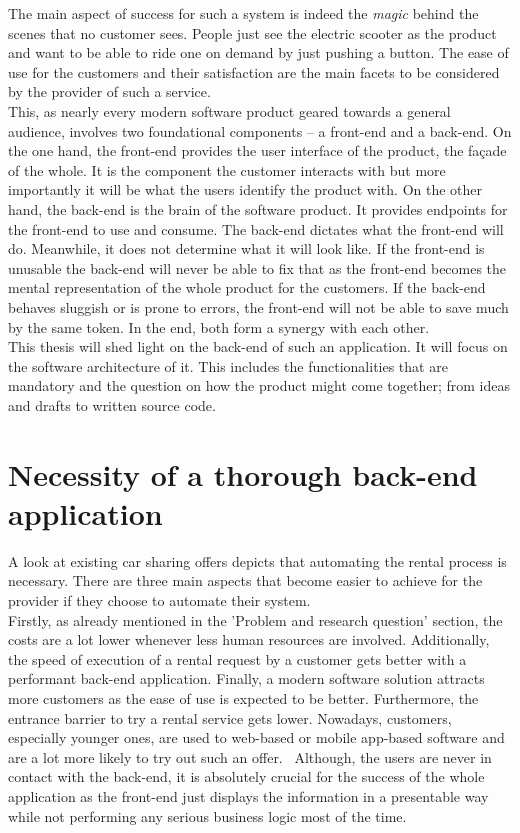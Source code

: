 \documentclass[12pt,a4paper]{report}
\begin{document}
The main aspect of success for such a system is indeed the \emph{magic} behind the scenes
that no customer sees. People just see the electric scooter as the product and
want to be able to ride one on demand by just pushing a button.
The ease of use for the customers and their satisfaction are the main facets
to be considered by the provider of such a service.\\
This, as nearly every modern software product geared towards a general audience,
involves two foundational components – a front-end and a back-end.
On the one hand, the front-end provides the user interface of the product, the façade of the whole.
It is the component the customer interacts with but more importantly it will be
what the users identify the product with.
On the other hand, the back-end is the brain of the software product.
It provides endpoints for the front-end to use and consume. The back-end dictates
what the front-end will do. Meanwhile, it does not determine what it will look like.
If the front-end is unusable the back-end will never be able to fix that as the
front-end becomes the mental representation of the whole product for the customers.
If the back-end behaves sluggish or is prone to errors, the front-end will not be able to save much
by the same token. In the end, both form a synergy with each other.\\
This thesis will shed light on the back-end of such an application.
It will focus on the software architecture of it.
This includes the functionalities that are mandatory and the question on how the product
might come together; from ideas and drafts to written source code.


\section{Necessity of a thorough back-end application}

A look at existing car sharing offers depicts that automating the rental process
is necessary. There are three main aspects that become easier to achieve for the
provider if they choose to automate their system.\\
Firstly, as already mentioned in the 'Problem and research question' section,
the costs are a lot lower whenever less human resources are involved.
Additionally, the speed of execution of a rental request by a customer gets better
with a performant back-end application.
Finally, a modern software solution attracts more customers as the ease of use
is expected to be better. Furthermore, the entrance barrier to try a rental service
gets lower. Nowadays, customers, especially younger ones, are used to web-based
or mobile app-based software and are a lot more likely to try out such an offer.~\cn
Although, the users are never in contact with the back-end, it is absolutely
crucial for the success of the whole application as the front-end just displays
the information in a presentable way while not performing any serious
business logic most of the time.
\end{document}
